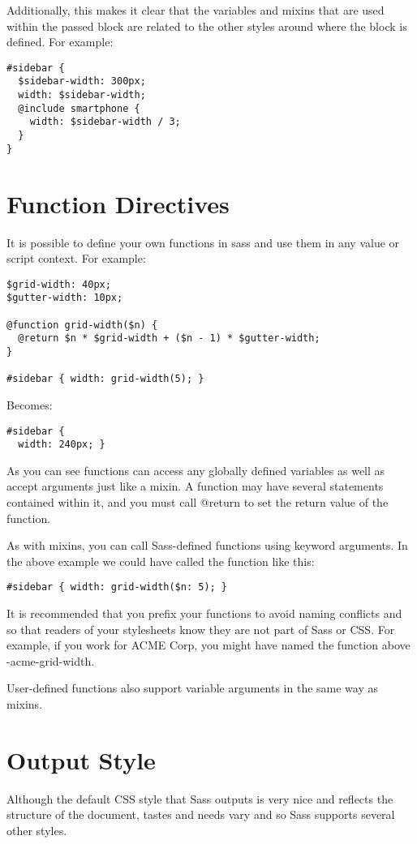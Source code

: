 \documentclass[9pt]{article}
\begin{document}
 Additionally, this makes it clear that the variables and mixins that are used within the passed block are related to the other styles around where the block is defined. For example:
\begin{verbatim}
#sidebar {
  $sidebar-width: 300px;
  width: $sidebar-width;
  @include smartphone {
    width: $sidebar-width / 3;
  }
}
\end{verbatim}
\section{Function Directives}


 It is possible to define your own functions in sass and use them in any value or script context. For example:
\begin{verbatim}
$grid-width: 40px;
$gutter-width: 10px;

@function grid-width($n) {
  @return $n * $grid-width + ($n - 1) * $gutter-width;
}

#sidebar { width: grid-width(5); }
\end{verbatim}


 Becomes:
\begin{verbatim}
#sidebar {
  width: 240px; }
\end{verbatim}


 As you can see functions can access any globally defined variables as well as accept arguments just like a mixin. A function may have several statements contained within it, and you must call @return to set the return value of the function.


 As with mixins, you can call Sass-defined functions using keyword arguments. In the above example we could have called the function like this:
\begin{verbatim}
#sidebar { width: grid-width($n: 5); }
\end{verbatim}


 It is recommended that you prefix your functions to avoid naming conflicts and so that readers of your stylesheets know they are not part of Sass or CSS. For example, if you work for ACME Corp, you might have named the function above -acme-grid-width.


 User-defined functions also support variable arguments in the same way as mixins.
\section{Output Style}


 Although the default CSS style that Sass outputs is very nice and reflects the structure of the document, tastes and needs vary and so Sass supports several other styles.
\end{document}
